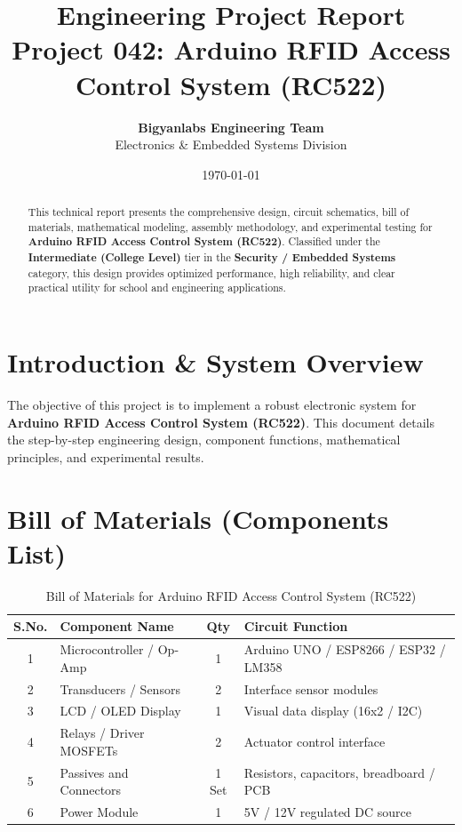 \documentclass[11pt,a4paper]{article}
\title{\textbf{\Huge Engineering Project Report}\\[0.5em] \Large Project 042: Arduino RFID Access Control System (RC522)}
\author{\textbf{Bigyanlabs Engineering Team}\\ Electronics \& Embedded Systems Division}
\date{\today}
\begin{document}
\maketitle
\thispagestyle{empty}

\begin{abstract}
This technical report presents the comprehensive design, circuit schematics, bill of materials, mathematical modeling, assembly methodology, and experimental testing for \textbf{Arduino RFID Access Control System (RC522)}. Classified under the \textbf{Intermediate (College Level)} tier in the \textbf{Security / Embedded Systems} category, this design provides optimized performance, high reliability, and clear practical utility for school and engineering applications.
\end{abstract}

\newpage
\tableofcontents
\newpage

\section{Introduction \& System Overview}
The objective of this project is to implement a robust electronic system for \textbf{Arduino RFID Access Control System (RC522)}. This document details the step-by-step engineering design, component functions, mathematical principles, and experimental results.

\section{Bill of Materials (Components List)}
\begin{table}[h!]
\centering
\caption{Bill of Materials for Arduino RFID Access Control System (RC522)}
\vspace{0.5em}
\begin{tabular}{clcp{7cm}}
\toprule
\textbf{S.No.} & \textbf{Component Name} & \textbf{Qty} & \textbf{Circuit Function} \\
\midrule
1 & Microcontroller / Op-Amp & 1 & Arduino UNO / ESP8266 / ESP32 / LM358 \\
2 & Transducers / Sensors & 2 & Interface sensor modules \\
3 & LCD / OLED Display & 1 & Visual data display (16x2 / I2C) \\
4 & Relays / Driver MOSFETs & 2 & Actuator control interface \\
5 & Passives and Connectors & 1 Set & Resistors, capacitors, breadboard / PCB \\
6 & Power Module & 1 & 5V / 12V regulated DC source \\
\bottomrule
\end{tabular}
\end{table}
\end{document}
